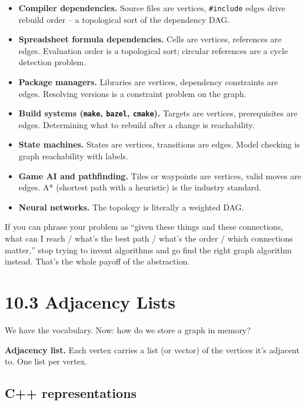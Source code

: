 \documentclass[11pt]{article}
\begin{document}
\begin{itemize}[leftmargin=*]
    \item \textbf{Compiler dependencies.} Source files are vertices, \texttt{\#include} edges drive rebuild order -- a topological sort of the dependency DAG.
    \item \textbf{Spreadsheet formula dependencies.} Cells are vertices, references are edges. Evaluation order is a topological sort; circular references are a cycle detection problem.
    \item \textbf{Package managers.} Libraries are vertices, dependency constraints are edges. Resolving versions is a constraint problem on the graph.
    \item \textbf{Build systems (\texttt{make}, \texttt{bazel}, \texttt{cmake}).} Targets are vertices, prerequisites are edges. Determining what to rebuild after a change is reachability.
    \item \textbf{State machines.} States are vertices, transitions are edges. Model checking is graph reachability with labels.
    \item \textbf{Game AI and pathfinding.} Tiles or waypoints are vertices, valid moves are edges. A* (shortest path with a heuristic) is the industry standard.
    \item \textbf{Neural networks.} The topology is literally a weighted DAG.
\end{itemize}

\begin{notebox}
If you can phrase your problem as ``given these things and these connections, what can I reach / what's the best path / what's the order / which connections matter,'' stop trying to invent algorithms and go find the right graph algorithm instead. That's the whole payoff of the abstraction.
\end{notebox}

\section{10.3 Adjacency Lists}

We have the vocabulary. Now: how do we store a graph in memory?

\begin{defnbox}
\textbf{Adjacency list.} Each vertex carries a list (or vector) of the vertices it's adjacent to. One list per vertex.
\end{defnbox}

\subsection*{C++ representations}
\end{document}
